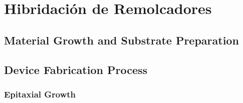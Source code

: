 \chapter{Hibridación de Remolcadores}


\section{Material Growth and Substrate Preparation}


\section{Device Fabrication Process}


\subsection{Epitaxial Growth}

